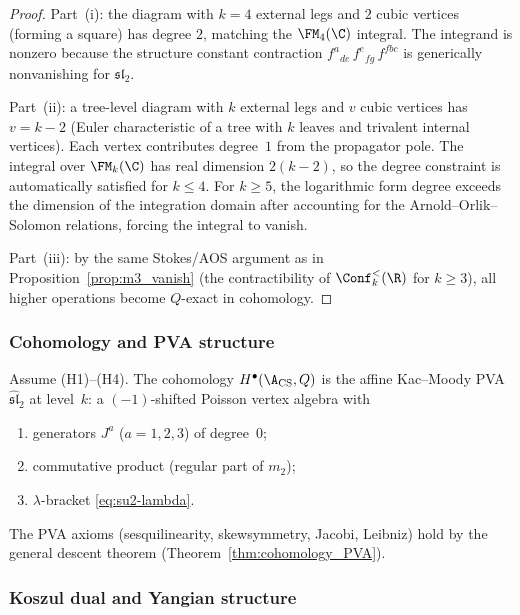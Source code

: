 \begin{proof}
Part~(i): the diagram with $k=4$ external legs and $2$ cubic
vertices (forming a square) has degree $2$, matching the
$\FM_4(\C)$ integral. The integrand is nonzero because the
structure constant contraction
$f^{a}{}_{de}\, f^{e}{}_{fg}\, f^{fbc}$ is generically
nonvanishing for $\mathfrak{sl}_2$.

Part~(ii): a tree-level diagram with $k$ external legs and $v$
cubic vertices has $v = k - 2$ (Euler characteristic of a tree
with $k$ leaves and trivalent internal vertices). Each vertex
contributes degree~$1$ from the propagator pole. The integral
over $\FM_k(\C)$ has real dimension $2(k-2)$, so the degree
constraint is automatically satisfied for $k \leq 4$. For
$k \geq 5$, the logarithmic form degree exceeds the dimension
of the integration domain after accounting for the
Arnold--Orlik--Solomon relations, forcing the integral to vanish.

Part~(iii): by the same Stokes/AOS argument as in
Proposition~\ref{prop:m3_vanish} (the contractibility of
$\Conf_k^{<}(\R)$ for $k \geq 3$), all higher operations become
$Q$-exact in cohomology.
\end{proof}

\subsubsection{Cohomology and PVA structure}

\begin{theorem}
Assume \textrm{(H1)--(H4)}. The cohomology
$H^\bullet(\A_{\text{CS}}, Q)$ is the affine Kac--Moody PVA
$\widehat{\mathfrak{sl}}_2$ at level~$k$: a
$(-1)$-shifted Poisson vertex algebra with
\begin{enumerate}[label=\textup{(\roman*)}]
\item generators $J^a$ ($a = 1,2,3$) of degree~$0$;
\item commutative product (regular part of $m_2$);
\item $\lambda$-bracket \eqref{eq:su2-lambda}.
\end{enumerate}
The PVA axioms (sesquilinearity, skewsymmetry, Jacobi, Leibniz)
hold by the general descent theorem
(Theorem~\ref{thm:cohomology_PVA}).
\end{theorem}

\subsubsection{Koszul dual and Yangian structure}

